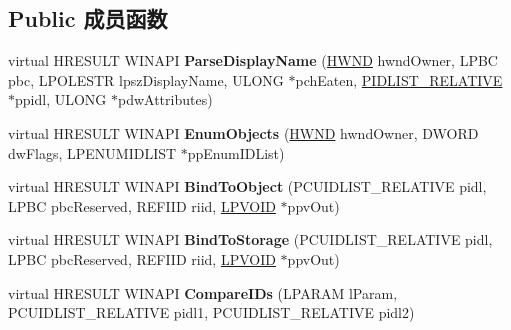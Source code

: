 \subsection*{Public 成员函数}
\begin{DoxyCompactItemize}
\item 
\mbox{\label{class_c_admin_tools_folder_a91a47c862597a08919766e4477e76e5c}} 
virtual H\+R\+E\+S\+U\+LT W\+I\+N\+A\+PI {\bfseries Parse\+Display\+Name} (\hyperlink{interfacevoid}{H\+W\+ND} hwnd\+Owner, L\+P\+BC pbc, L\+P\+O\+L\+E\+S\+TR lpsz\+Display\+Name, U\+L\+O\+NG $\ast$pch\+Eaten, \hyperlink{struct___i_t_e_m_i_d_l_i_s_t___r_e_l_a_t_i_v_e}{P\+I\+D\+L\+I\+S\+T\+\_\+\+R\+E\+L\+A\+T\+I\+VE} $\ast$ppidl, U\+L\+O\+NG $\ast$pdw\+Attributes)
\item 
\mbox{\label{class_c_admin_tools_folder_a290631d2cae9368f8e2bf934cae71999}} 
virtual H\+R\+E\+S\+U\+LT W\+I\+N\+A\+PI {\bfseries Enum\+Objects} (\hyperlink{interfacevoid}{H\+W\+ND} hwnd\+Owner, D\+W\+O\+RD dw\+Flags, L\+P\+E\+N\+U\+M\+I\+D\+L\+I\+ST $\ast$pp\+Enum\+I\+D\+List)
\item 
\mbox{\label{class_c_admin_tools_folder_a309f2e953a80ef8cf6175d04400aa7de}} 
virtual H\+R\+E\+S\+U\+LT W\+I\+N\+A\+PI {\bfseries Bind\+To\+Object} (P\+C\+U\+I\+D\+L\+I\+S\+T\+\_\+\+R\+E\+L\+A\+T\+I\+VE pidl, L\+P\+BC pbc\+Reserved, R\+E\+F\+I\+ID riid, \hyperlink{interfacevoid}{L\+P\+V\+O\+ID} $\ast$ppv\+Out)
\item 
\mbox{\label{class_c_admin_tools_folder_ad9043a0c5589da796e38608b7bce1cff}} 
virtual H\+R\+E\+S\+U\+LT W\+I\+N\+A\+PI {\bfseries Bind\+To\+Storage} (P\+C\+U\+I\+D\+L\+I\+S\+T\+\_\+\+R\+E\+L\+A\+T\+I\+VE pidl, L\+P\+BC pbc\+Reserved, R\+E\+F\+I\+ID riid, \hyperlink{interfacevoid}{L\+P\+V\+O\+ID} $\ast$ppv\+Out)
\item 
\mbox{\label{class_c_admin_tools_folder_ae9c2e5c85d405f27d23eb592df86bfc9}} 
virtual H\+R\+E\+S\+U\+LT W\+I\+N\+A\+PI {\bfseries Compare\+I\+Ds} (L\+P\+A\+R\+AM l\+Param, P\+C\+U\+I\+D\+L\+I\+S\+T\+\_\+\+R\+E\+L\+A\+T\+I\+VE pidl1, P\+C\+U\+I\+D\+L\+I\+S\+T\+\_\+\+R\+E\+L\+A\+T\+I\+VE pidl2)
\item 
\mbox{\label{class_c_admin_tools_folder_aba69711c006a903b9531902968376118}} 

\end{DoxyCompactItemize}
